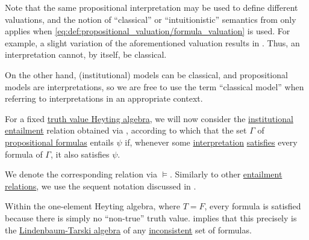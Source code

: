\begin{remark}\label{rem:classical_propositional_interpretations}
  Note that the same propositional interpretation may be used to define different valuations, and the notion of \enquote{classical} or \enquote{intuitionistic} semantics from  only applies when \eqref{eq:def:propositional_valuation/formula_valuation} is used. For example, a slight variation of the aforementioned valuation results in . Thus, an interpretation cannot, by itself, be classical.

  On the other hand, (institutional) models can be classical, and propositional models are interpretations, so we are free to use the term \enquote{classical model} when referring to interpretations in an appropriate context.
\end{remark}

\begin{definition}\label{def:propositional_entailment}\mimprovised
  For a fixed \hyperref[def:truth_value_algebra]{truth value Heyting algebra}, we will now consider the \hyperref[def:institutional_entailment]{institutional entailment} relation obtained via , according to which that the set \( \Gamma \) of \hyperref[def:propositional_syntax/formula]{propositional formulas} entails \( \psi \) if, whenever some \hyperref[def:propositional_valuation/interpretation]{interpretation} \hyperref[thm:propositional_institution/satisfaction]{satisfies} every formula of \( \Gamma \), it also satisfies \( \psi \).

  We denote the corresponding relation via \( {\vDash} \). Similarly to other \hyperref[def:entailment_system/entailment]{entailment relations}, we use the sequent notation discussed in .
\end{definition}

\begin{example}\label{ex:trivial_heyting_semantics}
  Within the one-element Heyting algebra, where \( T = F \), every formula is satisfied because there is simply no \enquote{non-true} truth value.  implies that this precisely is the \hyperref[def:lindenbaum_tarski_algebra]{Lindenbaum-Tarski algebra} of any \hyperref[def:consistent_set_of_sentences]{inconsistent} set of formulas.
\end{example}

